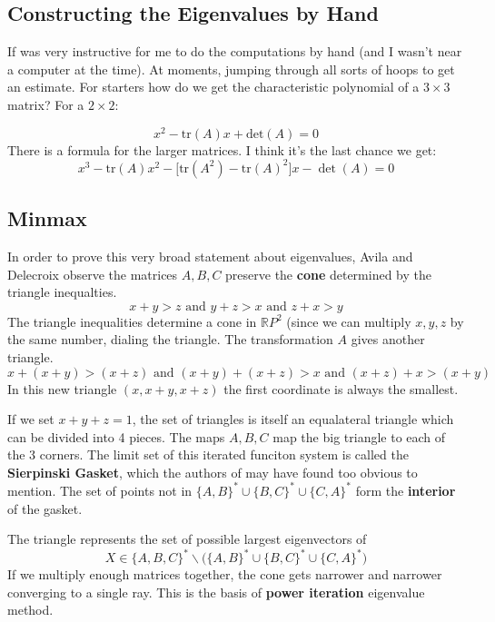 \documentclass[12pt]{article}
\begin{document}
{\subsection{Constructing the Eigenvalues by Hand}

If was very instructive for me to do the computations by hand (and I wasn't near a computer at the time).  At moments, jumping through all sorts of hoops to get an estimate.  For starters how do we get the characteristic polynomial of a $3 \times 3$ matrix?  For a $2 \times 2$:

$$ x^2 - \textrm{tr}(A)x +  \textrm{det} (A) = 0$$
There is a formula for the larger matrices.  I think it's the last chance we get:
$$ x^3 - \mathrm{tr}(A)x^2 - \big[\mathrm{tr}(A^2) - \mathrm{tr}(A)^2\big]x - \det(A) = 0$$
\subsection{Minmax}

In order to prove this very broad statement about eigenvalues, Avila and Delecroix observe the matrices $A,B,C$ preserve the \textbf{cone} determined by the triangle inequalties.
$$ x + y > z \text{ and } y + z > x \text{ and } z + x > y$$
The triangle inequalities determine a cone in $\mathbb{R}P^2$ (since we can multiply $x,y,z$ by the same number, dialing the triangle.  The transformation $A$ gives another triangle.
$$ x + (x+y) > (x+z)\text{ and } (x+y) + (x+z) > x \text{ and } (x+z) + x > (x+y)$$
In this new triangle $(x, x+y, x+z)$ the first coordinate is always the smallest. \newline

\noindent If we set $x+y+z=1$, the set of triangles is itself an equalateral triangle which can be divided into 4 pieces.  The maps $A,B,C$ map the big triangle to each of the 3 corners.  The limit set of this iterated funciton system is called the \textbf{Sierpinski Gasket}, which the authors of \cite{AD} may have found too obvious to mention.  The set of points not in $\{A,B\}^*\cup \{B,C\}^*\cup\{C,A\}^*$ form the \textbf{interior} of the gasket. \newline

\noindent The triangle represents the set of possible largest eigenvectors of $$X \in \{ A,B,C\}^* \backslash \Big( \{A,B\}^*\cup \{B,C\}^*\cup\{C,A\}^* \Big) $$
If we multiply enough matrices together, the cone gets narrower and narrower converging to a single ray.  This is the basis of \textbf{power iteration} eigenvalue method.   \newline

}
\end{document}
